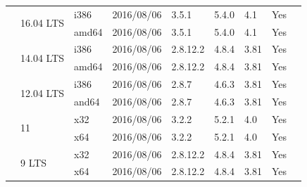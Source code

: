 \documentclass[11pt,twoside,openany,x11names,svgnames]{memoir}
\begin{document}
{\begin{longtable}{| >{\bfseries}p{3cm} | p{2.6cm} | p{1cm} | p{1.5cm} | p{1cm} | p{0.7cm} | p{0.7cm} | p{0.8cm} | p{1.5cm} |}
	\hline
	\hline
	
	\multirow{6}{*}{\texttt{Ubuntu Desktop}}      & \multirow{2}{*}{16.04 LTS}     & i386   & 2016/08/06  & 3.5.1    & 5.4.0 & 4.1   & Yes   &  \\
																		           \cline{3-8}
	                                              &                                & amd64  & 2016/08/06  & 3.5.1    & 5.4.0 & 4.1   & Yes   &  \\
	                                              \cline{2-8}
	                                              & \multirow{2}{*}{14.04 LTS}     & i386   & 2016/08/06  & 2.8.12.2 & 4.8.4 & 3.81  & Yes   &  \\
	                                         							           \cline{3-8}
	                                              &                                & amd64  & 2016/08/06  & 2.8.12.2 & 4.8.4 & 3.81  & Yes   &  \\
	                                              \cline{2-8}
	                                              & \multirow{2}{*}{12.04 LTS}     & i386   & 2016/08/06  & 2.8.7    & 4.6.3 & 3.81  & Yes   &  \\
	                                         							           \cline{3-8}
	                                              &                                & and64  & 2016/08/06  & 2.8.7    & 4.6.3 & 3.81  & Yes   &  \\
	                                             
	\hline
	\hline
	
	\multirow{4}{*}{\texttt{Zorin OS Core}}       & \multirow{2}{*}{11}            & x32    & 2016/08/06  & 3.2.2    & 5.2.1 & 4.0   & Yes   &  \\
																		           \cline{3-8}
	                                              &                                & x64    & 2016/08/06  & 3.2.2    & 5.2.1 & 4.0   & Yes   &  \\
	                                              \cline{2-8}
	                                              & \multirow{2}{*}{9 LTS}         & x32    & 2016/08/06  & 2.8.12.2 & 4.8.4 & 3.81  & Yes   &  \\
	                                         	 						           \cline{3-8}
	                                              &                                & x64    & 2016/08/06  & 2.8.12.2 & 4.8.4 & 3.81  & Yes   &  \\
	\hline
	\hline
	                        

\end{longtable}}
\end{document}
